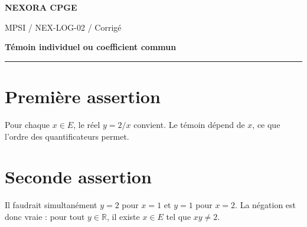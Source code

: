 \documentclass[11pt,a4paper]{article}
\begin{document}
{\small\bfseries\color{nexorablue} NEXORA CPGE}\par
{\small MPSI / NEX-LOG-02 / Corrigé}\par
{\LARGE\bfseries Témoin individuel ou coefficient commun}\par
\vspace{0.25em}\hrule\vspace{0.6em}

\section*{Première assertion}
Pour chaque $x\in E$, le réel $y=2/x$ convient. Le témoin dépend de $x$, ce que l’ordre des quantificateurs permet.

\section*{Seconde assertion}
Il faudrait simultanément $y=2$ pour $x=1$ et $y=1$ pour $x=2$. La négation est donc vraie : pour tout $y\in\mathbb R$, il existe $x\in E$ tel que $xy\ne2$.
\end{document}
